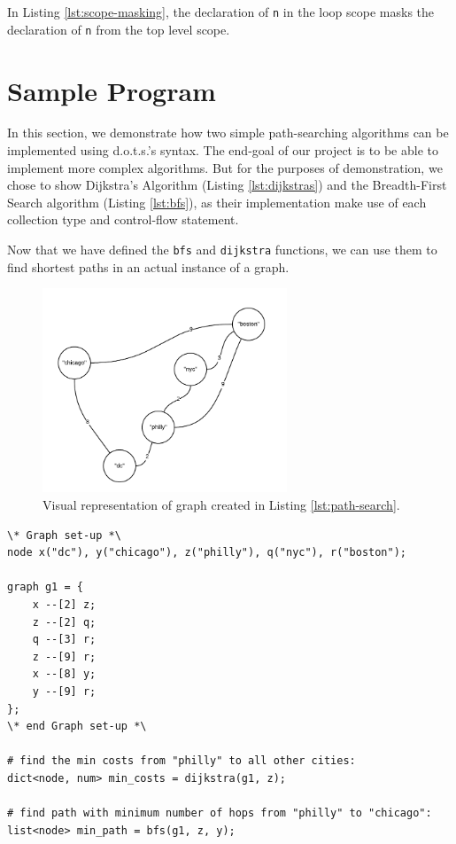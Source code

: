 \documentclass{article}
\newcommand{\pltlang}{d.o.t.s.} %
\newcommand{\code}[1]{\texttt{#1}} %
\begin{document}
In Listing \ref{lst:scope-masking}, the declaration of \code{n} in the loop scope masks the declaration of \code{n} from the top level scope.

\section{Sample Program}
\label{sec:code}

In this section, we demonstrate how two simple path-searching algorithms can be implemented using \pltlang's syntax. The end-goal of our project is to be able to implement more complex algorithms. But for the purposes of demonstration, we chose to show Dijkstra's Algorithm (Listing \ref{lst:dijkstras}) and the Breadth-First Search algorithm (Listing \ref{lst:bfs}), as their implementation make use of each collection type and control-flow statement. 






Now that we have defined the \code{bfs} and \code{dijkstra} functions, we can use them to find shortest paths in an actual instance of a graph.

\begin{figure}[H]
\centering
\includegraphics[width=0.65\textwidth]{graphs/example_city_graph.png}
\caption{Visual representation of graph created in Listing \ref{lst:path-search}.}
\label{fig:node_ops}
\end{figure}


\begin{lstlisting}[language=pltLang, caption=Using user-defined functions., label=lst:path-search]
\* Graph set-up *\
node x("dc"), y("chicago"), z("philly"), q("nyc"), r("boston");

graph g1 = {
    x --[2] z;
    z --[2] q;
    q --[3] r;
    z --[9] r;
    x --[8] y;
    y --[9] r;
};
\* end Graph set-up *\

# find the min costs from "philly" to all other cities:
dict<node, num> min_costs = dijkstra(g1, z);

# find path with minimum number of hops from "philly" to "chicago":
list<node> min_path = bfs(g1, z, y);


\end{lstlisting}
\end{document}
